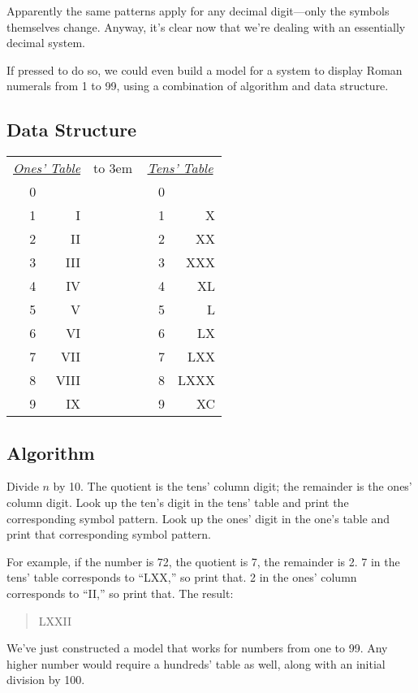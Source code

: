\noindent Apparently the same patterns apply for any decimal digit---only
the symbols themselves change. Anyway, it's clear now that we're dealing
with an essentially decimal system.

If pressed to do so, we could even build a model for a system to display
Roman numerals from 1 to 99, using a combination of algorithm and
data structure.

\subsection{Data Structure}

\bigskip
\begin{tabular}{lcrclcr}
\multicolumn{3}{c}{\underline{\emph{Ones' Table}}} &
\hbox to 3em{\hss} & \multicolumn{3}{c}{\underline{\emph{Tens' Table}}} \\
& 0 &          & &    & 0 & \\
& 1 &       I  & &    & 1 &      X \\
& 2 &      II  & &    & 2 &     XX \\
& 3 &     III  & &    & 3 &    XXX \\
& 4 &      IV  & &    & 4 &     XL \\
& 5 &       V  & &    & 5 &      L \\
& 6 &      VI  & &    & 6 &     LX \\
& 7 &     VII  & &    & 7 &    LXX \\
& 8 &    VIII  & &    & 8 &   LXXX \\
& 9 &      IX  & &    & 9 &     XC \\
\end{tabular}
\bigskip

\subsection{Algorithm}

Divide $n$ by 10. The quotient is the tens' column digit; the remainder is
the ones' column digit. Look up the ten's digit in the tens' table and
print the corresponding symbol pattern. Look up the ones' digit in the
one's table and print that corresponding symbol pattern.

For example, if the number is 72, the quotient is 7, the remainder is 2. 7
in the tens' table corresponds to ``LXX,'' so print that. 2 in the ones'
column corresponds to ``II,'' so print that. The result:

\begin{quote}
{\sf LXXII}
\end{quote}
We've just constructed a model that works for numbers from one to 99.
Any higher number would require a hundreds' table as well, along with
an initial division by 100.

